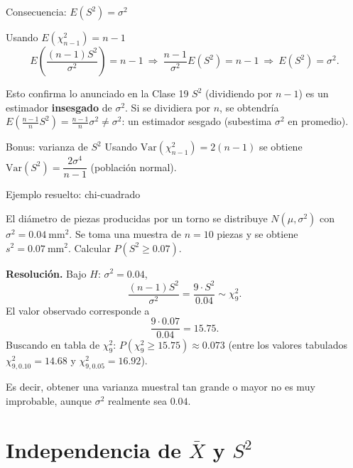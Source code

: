 \documentclass[aspectratio=169,11pt]{beamer}
\begin{document}
\begin{frame}{Consecuencia: $E(S^2)=\sigma^2$}
\begin{block}{Usando $E(\chi^2_{n-1}) = n-1$}
$$E\left(\frac{(n-1)S^2}{\sigma^2}\right) = n-1 \ \Longrightarrow \ \frac{n-1}{\sigma^2}E(S^2) = n-1 \ \Longrightarrow \ E(S^2)=\sigma^2.$$
\end{block}

\begin{alertblock}{Esto confirma lo anunciado en la Clase 19}
$S^2$ (dividiendo por $n-1$) es un estimador \textbf{insesgado} de $\sigma^2$. Si se dividiera por $n$, se obtendría $E\left(\frac{n-1}{n}S^2\right) = \frac{n-1}{n}\sigma^2 \ne \sigma^2$: un estimador sesgado (subestima $\sigma^2$ en promedio).
\end{alertblock}

\begin{block}{Bonus: varianza de $S^2$}
Usando $\text{Var}(\chi^2_{n-1})=2(n-1)$ se obtiene $\text{Var}(S^2) = \dfrac{2\sigma^4}{n-1}$ (población normal).
\end{block}
\end{frame}

\begin{frame}{Ejemplo resuelto: chi-cuadrado}
\begin{example}
El diámetro de piezas producidas por un torno se distribuye $N(\mu,\sigma^2)$ con $\sigma^2=0.04\ \text{mm}^2$. Se toma una muestra de $n=10$ piezas y se obtiene $s^2=0.07\ \text{mm}^2$. Calcular $P(S^2 \geq 0.07)$.

\textbf{Resolución.} Bajo $H$: $\sigma^2=0.04$,
$$\frac{(n-1)S^2}{\sigma^2} = \frac{9\cdot S^2}{0.04} \sim \chi^2_9.$$
El valor observado corresponde a
$$\frac{9\cdot 0.07}{0.04} = 15.75.$$
Buscando en tabla de $\chi^2_9$: $P(\chi^2_9 \geq 15.75) \approx 0.073$ (entre los valores tabulados $\chi^2_{9,0.10}=14.68$ y $\chi^2_{9,0.05}=16.92$).

Es decir, obtener una varianza muestral tan grande o mayor no es muy improbable, aunque $\sigma^2$ realmente sea $0.04$.
\end{example}
\end{frame}

\section{Independencia de $\bar X$ y $S^2$}
\end{document}
